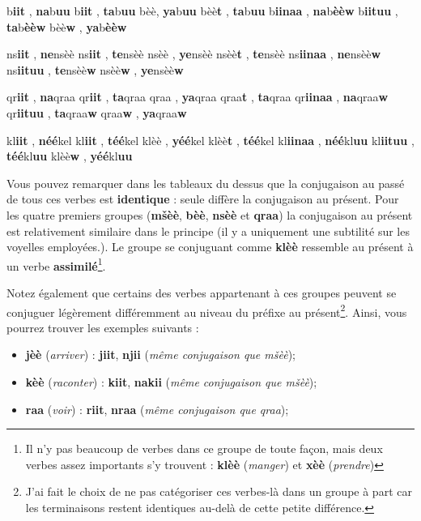     {\textcrh b\textbf{iit} , \textbf{na}\textcrh b\textbf{uu}}
    {\textcrh b\textbf{iit} , \textbf{ta}\textcrh b\textbf{uu}}
    {\textcrh bèè, \textbf{ya}\textcrh b\textbf{uu}}
    {\textcrh bèè\textbf{t} , \textbf{ta}\textcrh b\textbf{uu}}
    {\textcrh b\textbf{iinaa} , \textbf{na}\textcrh b\textbf{èèw}}
    {\textcrh b\textbf{iituu} , \textbf{ta}\textcrh b\textbf{èèw}}
    {\textcrh bèè\textbf{w} , \textbf{ya}\textcrh b\textbf{èèw}}
    
    {ns\textbf{iit} , \textbf{ne}nsèè}
    {ns\textbf{iit} , \textbf{te}nsèè}
    {nsèè , \textbf{ye}nsèè}
    {nsèè\textbf{t} , \textbf{te}nsèè}
    {ns\textbf{iinaa} , \textbf{ne}nsèè\textbf{w}}
    {ns\textbf{iituu} , \textbf{te}nsèè\textbf{w}}
    {nsèè\textbf{w} , \textbf{ye}nsèè\textbf{w}}

    {qr\textbf{iit} , \textbf{na}qraa}
    {qr\textbf{iit} , \textbf{ta}qraa}
    {qraa , \textbf{ya}qraa}
    {qraa\textbf{t} , \textbf{ta}qraa}
    {qr\textbf{iinaa} , \textbf{na}qraa\textbf{w}}
    {qr\textbf{iituu} , \textbf{ta}qraa\textbf{w}}
    {qraa\textbf{w} , \textbf{ya}qraa\textbf{w}}

    {kl\textbf{iit} , \textbf{néé}kel}
    {kl\textbf{iit} , \textbf{téé}kel}
    {klèè , \textbf{yéé}kel}
    {klèè\textbf{t} , \textbf{téé}kel}
    {kl\textbf{iinaa} , \textbf{néé}kl\textbf{uu}}
    {kl\textbf{iituu} , \textbf{téé}kl\textbf{uu}}
    {klèè\textbf{w} , \textbf{yéé}kl\textbf{uu}}

Vous pouvez remarquer dans les tableaux du dessus que la conjugaison au passé de tous ces verbes est \textbf{identique} : seule diffère la conjugaison au présent. Pour les quatre premiers groupes (\textbf{m\v{s}èè}, \textbf{\textcrh bèè}, \textbf{nsèè} et \textbf{qraa}) la conjugaison au présent est relativement similaire dans le principe (il y a uniquement une subtilité sur les voyelles employées.). Le groupe se conjuguant comme \textbf{klèè} ressemble au présent à un verbe \textbf{assimilé}\footnote{Il n'y pas beaucoup de verbes dans ce groupe de toute façon, mais deux verbes assez importants s'y trouvent : \textbf{klèè} (\textit{manger}) et \textbf{x\dh èè} (\textit{prendre})}.

Notez également que certains des verbes appartenant à ces groupes peuvent se conjuguer légèrement différemment au niveau du préfixe au présent\footnote{J'ai fait le choix de ne pas catégoriser ces verbes-là dans un groupe à part car les terminaisons restent identiques au-delà de cette petite différence.}. Ainsi, vous pourrez trouver les exemples suivants : 
\begin{itemize}
    \item \textbf{jèè} (\textit{arriver}) : \textbf{jiit}, \textbf{njii} (\textit{même conjugaison que m\v{s}èè});
    \item \textbf{\textcrh kèè} (\textit{raconter}) : \textbf{\textcrh kiit}, \textbf{na\textcrh kii} (\textit{même conjugaison que m\v{s}èè}); 
    \item \textbf{raa} (\textit{voir}) : \textbf{riit}, \textbf{nraa} (\textit{même conjugaison que qraa}); 
\end{itemize}

